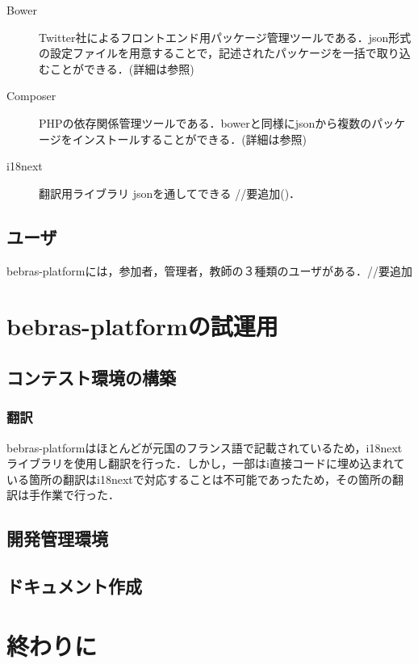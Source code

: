 \documentclass[a4paper]{jarticle}
\begin{document}
\begin{multicols}{2}
\begin{description}
\item[Bower]Twitter社によるフロントエンド用パッケージ管理ツールである．json形式の設定ファイルを用意することで，記述されたパッケージを一括で取り込むことができる．(詳細は\cite{bower}参照)
\end{description}

\begin{description}
\item[Composer] PHPの依存関係管理ツールである．bowerと同様にjsonから複数のパッケージをインストールすることができる．(詳細は\cite{composer}参照)
\end{description}

\begin{description}
\item[i18next] 翻訳用ライブラリ jsonを通してできる //要追加(\cite{i18n})．
\end{description}


\subsection{ユーザ}
bebras-platformには，参加者，管理者，教師の３種類のユーザがある．//要追加


\section{bebras-platformの試運用}
\subsection{コンテスト環境の構築}
\subsubsection{翻訳}
bebras-platformはほとんどが元国のフランス語で記載されているため，i18nextライブラリを使用し翻訳を行った．しかし，一部はi直接コードに埋め込まれている箇所の翻訳はi18nextで対応することは不可能であったため，その箇所の翻訳は手作業で行った．

\subsection{開発管理環境}

\subsection{ドキュメント作成}

\section{終わりに}


\end{multicols}
\end{document}
